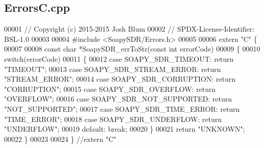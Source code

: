 \subsection{Errors\+C.\+cpp}
\label{ErrorsC_8cpp_source}

\begin{DoxyCode}
00001 \textcolor{comment}{// Copyright (c) 2015-2015 Josh Blum}
00002 \textcolor{comment}{// SPDX-License-Identifier: BSL-1.0}
00003 
00004 \textcolor{preprocessor}{#include <SoapySDR/Errors.h>}
00005 
00006 \textcolor{keyword}{extern} \textcolor{stringliteral}{"C"} \{
00007 
00008 \textcolor{keyword}{const} \textcolor{keywordtype}{char} *SoapySDR_errToStr(\textcolor{keyword}{const} \textcolor{keywordtype}{int} errorCode)
00009 \{
00010     \textcolor{keywordflow}{switch}(errorCode)
00011     \{
00012     \textcolor{keywordflow}{case} SOAPY_SDR_TIMEOUT:         \textcolor{keywordflow}{return} \textcolor{stringliteral}{"TIMEOUT"};
00013     \textcolor{keywordflow}{case} SOAPY_SDR_STREAM_ERROR:    \textcolor{keywordflow}{return} \textcolor{stringliteral}{"STREAM\_ERROR"};
00014     \textcolor{keywordflow}{case} SOAPY_SDR_CORRUPTION:      \textcolor{keywordflow}{return} \textcolor{stringliteral}{"CORRUPTION"};
00015     \textcolor{keywordflow}{case} SOAPY_SDR_OVERFLOW:        \textcolor{keywordflow}{return} \textcolor{stringliteral}{"OVERFLOW"};
00016     \textcolor{keywordflow}{case} SOAPY_SDR_NOT_SUPPORTED:   \textcolor{keywordflow}{return} \textcolor{stringliteral}{"NOT\_SUPPORTED"};
00017     \textcolor{keywordflow}{case} SOAPY_SDR_TIME_ERROR:      \textcolor{keywordflow}{return} \textcolor{stringliteral}{"TIME\_ERROR"};
00018     \textcolor{keywordflow}{case} SOAPY_SDR_UNDERFLOW:       \textcolor{keywordflow}{return} \textcolor{stringliteral}{"UNDERFLOW"};
00019     \textcolor{keywordflow}{default}: \textcolor{keywordflow}{break};
00020     \}
00021     \textcolor{keywordflow}{return} \textcolor{stringliteral}{"UNKNOWN"};
00022 \}
00023 
00024 \} \textcolor{comment}{//extern "C"}
\end{DoxyCode}
